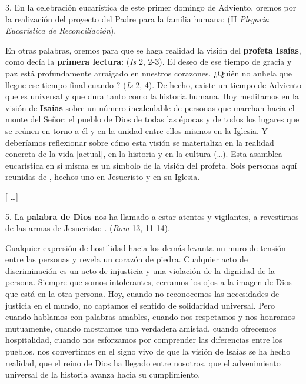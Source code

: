 \begin{body}
	3. En la celebración eucarística de este primer domingo de Adviento, oremos por la realización del proyecto del Padre para la familia humana:  (II \emph{Plegaria Eucarística de Reconciliación}).
	
	En otras palabras, oremos para que se haga realidad la visión del \textbf{profeta Isaías}, como decía la \textbf{primera lectura}:  (\emph{Is} 2, 2-3). El deseo de ese tiempo de gracia y paz está profundamente arraigado en nuestros corazones. ¿Quién no anhela que llegue ese tiempo final cuando ? (\emph{Is} 2, 4). De hecho, existe un tiempo de Adviento que es universal y que dura tanto como la historia humana. Hoy meditamos en la visión de \textbf{Isaías} sobre un número incalculable de personas que marchan hacia el monte del Señor: el pueblo de Dios de todas las épocas y de todos los lugares que se reúnen en torno a él y en la unidad entre ellos mismos en la Iglesia. Y deberíamos reflexionar sobre cómo esta visión se materializa en la realidad concreta de la vida {[}actual{]}, en la historia y en la cultura (\ldots{}). Esta asamblea eucarística en sí misma es un símbolo de la visión del profeta. Sois personas aquí reunidas de , hechos uno en Jesucristo y en su Iglesia.
	
	{[} \ldots{}{]}
	
	5. La \textbf{palabra de Dios} nos ha llamado a estar atentos y vigilantes, a revestirnos de las armas de Jesucristo: . (\emph{Rom} 13, 11-14).
	
	Cualquier expresión de hostilidad hacia los demás levanta un muro de tensión entre las personas y revela un corazón de piedra. Cualquier acto de discriminación es un acto de injusticia y una violación de la dignidad de la persona. Siempre que somos intolerantes, cerramos los ojos a la imagen de Dios que está en la otra persona. Hoy, cuando no reconocemos las necesidades de justicia en el mundo, no captamos el sentido de solidaridad universal. Pero cuando hablamos con palabras amables, cuando nos respetamos y nos honramos mutuamente, cuando mostramos una verdadera amistad, cuando ofrecemos hospitalidad, cuando nos esforzamos por comprender las diferencias entre los pueblos, nos convertimos en el signo vivo de que la visión de Isaías se ha hecho realidad, que el reino de Dios ha llegado entre nosotros, que el advenimiento universal de la historia avanza hacia su cumplimiento.
	

\end{body}
